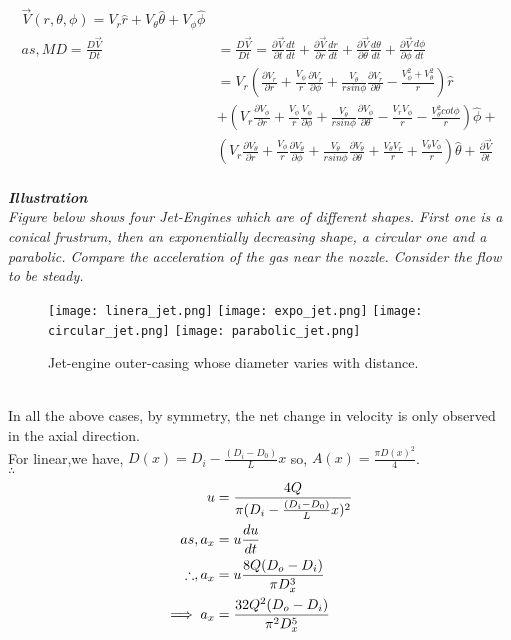 \documentclass{book}
\begin{document}
\begin{equation*}
\begin{split}
\vec{V}(r,\theta,\phi)=V_r\hat{r}+V_\theta\hat{\theta}+V_\phi\hat{\phi}\\
as,MD=\frac{D\vec{V}}{Dt}&=\frac{D\vec{V}}{Dt}=\frac{\partial \vec{V}}{\partial t}\frac{dt}{dt}+\frac{\partial \vec{V}}{\partial r}\frac{dr}{dt}+\frac{\partial \vec{V}}{\partial \theta}\frac{d\theta}{dt}+\frac{\partial \vec{V}}{\partial \phi}\frac{d\phi}{dt}\\
&=V_r(\frac{\partial V_r}{\partial r}+\frac{V_\phi}{r}\frac{\partial V_r}{\partial \phi}+\frac{V_\theta}{r sin\phi}\frac{\partial V_r}{\partial \theta}-\frac{V^2_\phi+V^2_\theta}{r})\hat{r}\\&+(V_r\frac{\partial V_\phi}{\partial r}+\frac{V_\phi}{r}\frac{V_\phi}{\partial \phi}+\frac{V_\theta}{rsin\phi}\frac{\partial V_\phi}{\partial \theta}-\frac{V_r V_\phi}{r}-\frac{V^2_\theta cot\phi}{r})\hat{\phi}+\\&(V_r\frac{\partial V_\theta}{\partial r}+\frac{V_\phi}{r}\frac{\partial V_\theta}{\partial \phi}+\frac{V_\theta}{rsin\phi}\frac{\partial V_\theta}{\partial \theta}+\frac{V_\theta V_r}{r}+\frac{V_\theta V_\phi}{r})\hat{\theta}+\frac{\partial \vec{V}}{\partial t}
\end{split}
\end{equation*}\\
\newpage
\emph{\textbf{{Illustration}}\\
Figure below shows four Jet-Engines which are of different shapes. First one is a conical frustrum, then an exponentially decreasing shape, a circular one and a parabolic. Compare the acceleration of the gas near the nozzle. Consider the flow to be steady.}\\
\begin{figure}[h]
\texttt{[image: linera\_jet.png]}
\texttt{[image: expo\_jet.png]}
\texttt{[image: circular\_jet.png]}
\texttt{[image: parabolic\_jet.png]}
\caption{Jet-engine outer-casing whose diameter varies with distance.}
\end{figure}\\
In all the above cases, by symmetry, the net change in velocity is only observed in the axial direction.\\
For linear,we have, $D(x)=D_i-\frac{(D_i-D_0)}{L}x$ so, $A(x)=\frac{\pi D(x)^2}{4}$.\\
$\therefore $
\begin{equation*}
\begin{split}
u&=\frac{4Q}{\pi (D_i-\frac{(D_i-D_0)}{L}x)^2}\\
as,a_x&=u\frac{du}{dt}\\
\therefore,\vspace{0.1cm}a_x&=u\frac{8Q(D_o-D_i)}{\pi D_x^3}\\
\implies a_x&=\frac{32Q^2(D_o-D_i)}{\pi^2 D_x^5}
\end{split}
\end{equation*}
\end{document}
